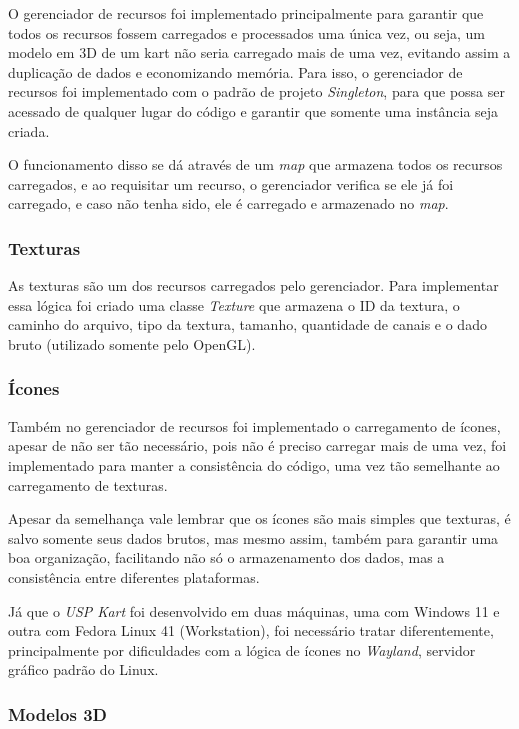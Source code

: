 O gerenciador de recursos foi implementado principalmente para garantir que todos os recursos fossem carregados e processados uma única vez, ou seja, um modelo em 3D de um kart não seria carregado mais de uma vez, evitando assim a duplicação de dados e economizando memória. Para isso, o gerenciador de recursos foi implementado com o padrão de projeto \textit{Singleton}, para que possa ser acessado de qualquer lugar do código e garantir que somente uma instância seja criada.

O funcionamento disso se dá através de um \textit{map} que armazena todos os recursos carregados, e ao requisitar um recurso, o gerenciador verifica se ele já foi carregado, e caso não tenha sido, ele é carregado e armazenado no \textit{map}.

\subsubsection{Texturas}

As texturas são um dos recursos carregados pelo gerenciador. Para implementar essa lógica foi criado uma classe \textit{Texture} que armazena o ID da textura, o caminho do arquivo, tipo da textura, tamanho, quantidade de canais e o dado bruto (utilizado somente pelo OpenGL).

\subsubsection{Ícones}

Também no gerenciador de recursos foi implementado o carregamento de ícones, apesar de não ser tão necessário, pois não é preciso carregar mais de uma vez, foi implementado para manter a consistência do código, uma vez tão semelhante ao carregamento de texturas.

Apesar da semelhança vale lembrar que os ícones são mais simples que texturas, é salvo somente seus dados brutos, mas mesmo assim, também para garantir uma boa organização, facilitando não só o armazenamento dos dados, mas a consistência entre diferentes plataformas. 

Já que o \textit{USP Kart} foi desenvolvido em duas máquinas, uma com Windows 11 e outra com Fedora Linux 41 (Workstation), foi necessário tratar diferentemente, principalmente por dificuldades com a lógica de ícones no \textit{Wayland}, servidor gráfico padrão do Linux.

\subsubsection{Modelos 3D}

